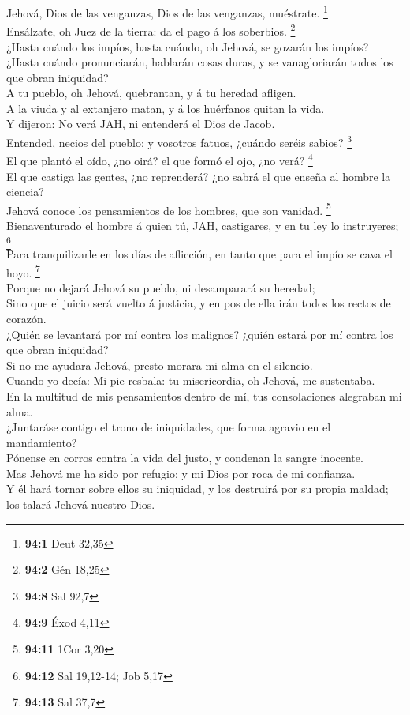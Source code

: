  Jehová, Dios de las venganzas, Dios de las venganzas,
muéstrate. \footnote{\textbf{94:1} Deut 32,35}\\
 Ensálzate, oh Juez de la tierra: da el pago á los
soberbios. \footnote{\textbf{94:2} Gén 18,25}\\
 ¿Hasta cuándo los impíos, hasta cuándo, oh Jehová, se
gozarán los impíos?\\
 ¿Hasta cuándo pronunciarán, hablarán cosas duras, y se
vanagloriarán todos los que obran iniquidad?\\
 A tu pueblo, oh Jehová, quebrantan, y á tu heredad
afligen.\\
 A la viuda y al extanjero matan, y á los huérfanos quitan
la vida.\\
 Y dijeron: No verá JAH, ni entenderá el Dios de Jacob.\\
 Entended, necios del pueblo; y vosotros fatuos, ¿cuándo
seréis sabios? \footnote{\textbf{94:8} Sal 92,7}\\
 El que plantó el oído, ¿no oirá? el que formó el ojo, ¿no
verá? \footnote{\textbf{94:9} Éxod 4,11}\\
 El que castiga las gentes, ¿no reprenderá? ¿no sabrá el
que enseña al hombre la ciencia?\\
 Jehová conoce los pensamientos de los hombres, que son
vanidad. \footnote{\textbf{94:11} 1Cor 3,20}\\
 Bienaventurado el hombre á quien tú, JAH, castigares, y
en tu ley lo instruyeres; \footnote{\textbf{94:12} Sal 19,12-14; Job
  5,17}\\
 Para tranquilizarle en los días de aflicción, en tanto
que para el impío se cava el hoyo. \footnote{\textbf{94:13} Sal 37,7}\\
 Porque no dejará Jehová su pueblo, ni desamparará su
heredad;\\
 Sino que el juicio será vuelto á justicia, y en pos de
ella irán todos los rectos de corazón.\\
 ¿Quién se levantará por mí contra los malignos? ¿quién
estará por mí contra los que obran iniquidad?\\
 Si no me ayudara Jehová, presto morara mi alma en el
silencio.\\
 Cuando yo decía: Mi pie resbala: tu misericordia, oh
Jehová, me sustentaba.\\
 En la multitud de mis pensamientos dentro de mí, tus
consolaciones alegraban mi alma.\\
 ¿Juntaráse contigo el trono de iniquidades, que forma
agravio en el mandamiento?\\
 Pónense en corros contra la vida del justo, y condenan
la sangre inocente.\\
 Mas Jehová me ha sido por refugio; y mi Dios por roca de
mi confianza.\\
 Y él hará tornar sobre ellos su iniquidad, y los
destruirá por su propia maldad; los talará Jehová nuestro Dios.

